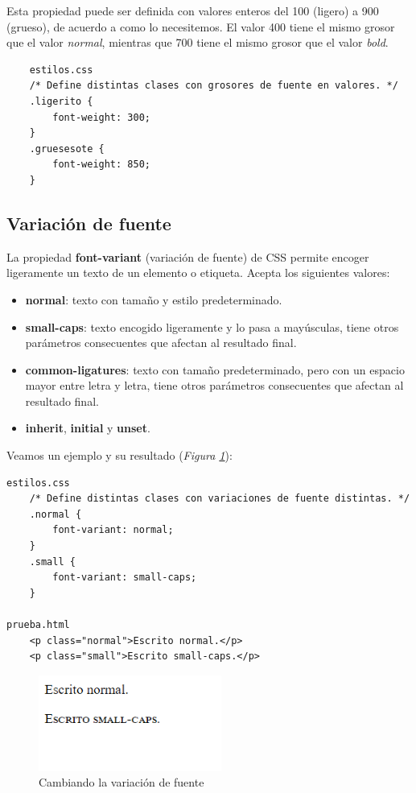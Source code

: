 Esta propiedad puede ser definida con valores enteros del 100 (ligero) a 900 (grueso), de acuerdo a como lo necesitemos. El valor 400 tiene el mismo grosor que el valor \textit{normal}, mientras que 700 tiene el mismo grosor que el valor \textit{bold}.
\begin{lstlisting}
    estilos.css
    /* Define distintas clases con grosores de fuente en valores. */
    .ligerito {   
        font-weight: 300;
    }
    .gruesesote {   
        font-weight: 850;
    }
\end{lstlisting}


\subsection{Variación de fuente}

La propiedad \textbf{font-variant} (variación de fuente) de CSS permite encoger ligeramente un texto de un elemento o etiqueta. Acepta los siguientes valores:
\begin{itemize}
    \item \textbf{normal}: texto con tamaño y estilo predeterminado.
    \item \textbf{small-caps}: texto encogido ligeramente y lo pasa a mayúsculas, tiene otros parámetros consecuentes que afectan al resultado final.
    \item \textbf{common-ligatures}: texto con tamaño predeterminado, pero con un espacio mayor entre letra y letra, tiene otros parámetros consecuentes que afectan al resultado final.
    \item \textbf{inherit}, \textbf{initial} y \textbf{unset}.
\end{itemize}

Veamos un ejemplo y su resultado (\textit{Figura \ref{fig: 7}}):
\begin{lstlisting}
estilos.css
    /* Define distintas clases con variaciones de fuente distintas. */
    .normal {
        font-variant: normal;
    }
    .small {
        font-variant: small-caps;
    }

prueba.html
    <p class="normal">Escrito normal.</p>
    <p class="small">Escrito small-caps.</p>
\end{lstlisting}
\begin{figure}[H]
    \centering
    \caption{Cambiando la variación de fuente}
    \label{fig: 7}
    \includegraphics[width=6cm]{ss/fuentes-var.png}
\end{figure}


